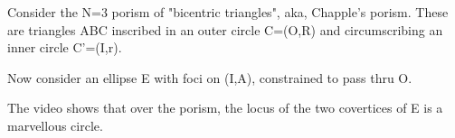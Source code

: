 Consider the N=3 porism of "bicentric triangles", aka, Chapple's porism. These are triangles ABC inscribed in an outer circle C=(O,R) and circumscribing an inner circle C'=(I,r).

Now consider an ellipse E with foci on (I,A), constrained to pass thru O.

The video shows that over the porism, the locus of the two covertices of E is a marvellous circle.